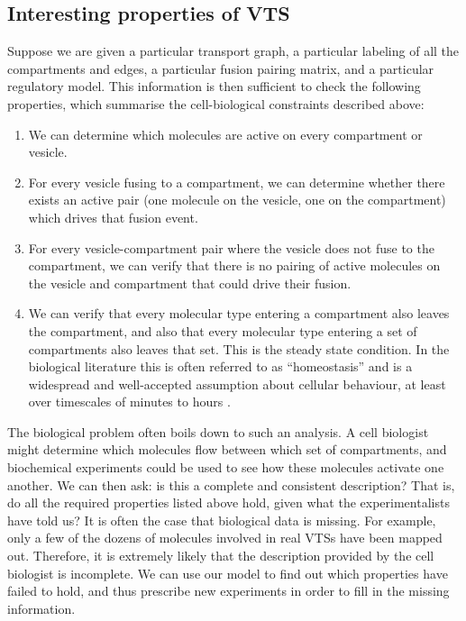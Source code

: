 \subsection{Interesting properties of VTS}
Suppose we are given a particular transport graph, a particular labeling of all the compartments and edges, a particular fusion pairing matrix, and a particular regulatory model. This information is then sufficient to check the following properties, which summarise the cell-biological constraints described above:
\begin{enumerate}
	\item We can determine which molecules are active on every compartment or vesicle.
	\item For every vesicle fusing to a compartment, we can determine whether there exists an active pair (one molecule on the vesicle, one on the compartment) which drives that fusion event.
	\item For every vesicle-compartment pair where the vesicle does not fuse to the compartment, we can verify that there is no pairing of active molecules on the
	vesicle and compartment that could drive their fusion.
	\item We can verify that every molecular type entering a compartment also leaves the compartment, and also that every molecular type entering a set of compartments also leaves that set. This is the steady state condition. In the biological literature this is often referred to as “homeostasis” and is a widespread and well-accepted assumption about cellular behaviour, at least over timescales of minutes to hours \cite{mani2016stacking}.
\end{enumerate}

The biological problem often boils down to such an analysis. A cell biologist might determine which molecules flow between which set of compartments, and biochemical experiments could be used to see how these molecules activate one another. We can then ask: is this a complete and consistent description? That is, do all the required properties listed above hold, given what the experimentalists have told us? It is often the case that biological data is missing. For example, only a few of the dozens of molecules involved in real VTSs have been mapped out. Therefore, it is extremely likely that the description provided by the cell biologist is incomplete. We can use our model to find out which properties have failed to hold, and thus prescribe new experiments in order to fill in the missing information.

